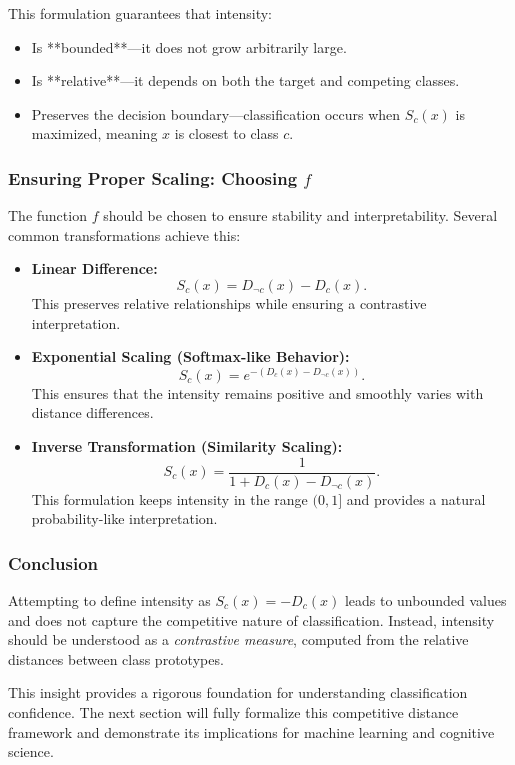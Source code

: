 This formulation guarantees that intensity:

\begin{itemize}
    \item Is **bounded**—it does not grow arbitrarily large.
    \item Is **relative**—it depends on both the target and competing classes.
    \item Preserves the decision boundary—classification occurs when \( S_c(x) \) is maximized, meaning \( x \) is closest to class \( c \).
\end{itemize}

\subsubsection{Ensuring Proper Scaling: Choosing \( f \)}

The function \( f \) should be chosen to ensure stability and interpretability. Several common transformations achieve this:

\begin{itemize}
    \item \textbf{Linear Difference:}  
    \[
    S_c(x) = D_{\neg c}(x) - D_c(x).
    \]
    This preserves relative relationships while ensuring a contrastive interpretation.
    
    \item \textbf{Exponential Scaling (Softmax-like Behavior):}  
    \[
    S_c(x) = e^{-(D_c(x) - D_{\neg c}(x))}.
    \]
    This ensures that the intensity remains positive and smoothly varies with distance differences.
    
    \item \textbf{Inverse Transformation (Similarity Scaling):}  
    \[
    S_c(x) = \frac{1}{1 + D_c(x) - D_{\neg c}(x)}.
    \]
    This formulation keeps intensity in the range \( (0,1] \) and provides a natural probability-like interpretation.
\end{itemize}

\subsubsection{Conclusion}

Attempting to define intensity as \( S_c(x) = -D_c(x) \) leads to unbounded values and does not capture the competitive nature of classification. Instead, intensity should be understood as a \textit{contrastive measure}, computed from the relative distances between class prototypes.

This insight provides a rigorous foundation for understanding classification confidence. The next section will fully formalize this competitive distance framework and demonstrate its implications for machine learning and cognitive science.
